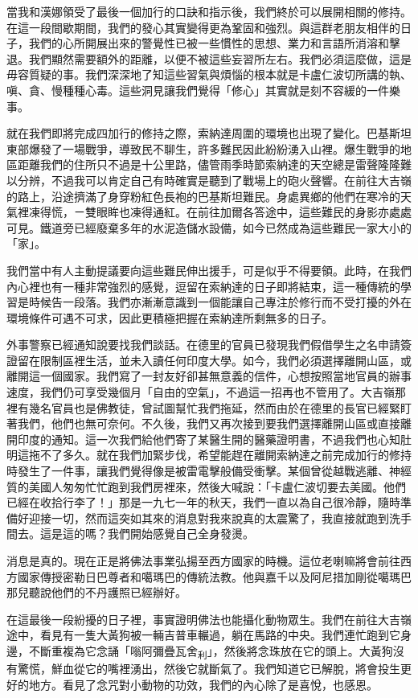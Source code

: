 當我和漢娜領受了最後一個加行的口訣和指示後，我們終於可以展開相關的修持。在這一段間歇期間，我們的發心其實變得更為鞏固和強烈。與這群老朋友相伴的日子，我們的心所開展出來的警覺性已被一些慣性的思想、業力和言語所消溶和擊退。我們顯然需要額外的距離，以便不被這些妄習所左右。我們必須這麼做，這是毋容質疑的事。我們深深地了知這些習氣與煩惱的根本就是卡盧仁波切所講的執、嗔、貪、慢種種心毒。這些洞見讓我們覺得「修心」其實就是刻不容緩的一件樂事。

就在我們即將完成四加行的修持之際，索納達周圍的環境也出現了變化。巴基斯坦東部爆發了一場戰爭，導致民不聊生，許多難民因此紛紛湧入山裡。爆生戰爭的地區距離我們的住所只不過是十公里路，儘管雨季時節索納達的天空總是雷聲隆隆難以分辨，不過我可以肯定自己有時確實是聽到了戰場上的砲火聲響。在前往大吉嶺的路上，沿途擠滿了身穿粉紅色長袍的巴基斯坦難民。身處異鄉的他們在寒冷的天氣裡凍得慌，ㄧ雙眼眸也凍得通紅。在前往加爾各答途中，這些難民的身影亦處處可見。鐵道旁已經廢棄多年的水泥造儲水設備，如今已然成為這些難民一家大小的「家」。

我們當中有人主動提議要向這些難民伸出援手，可是似乎不得要領。此時，在我們內心裡也有一種非常強烈的感覺，逗留在索納達的日子即將結束，這一種傳統的學習是時候告一段落。我們亦漸漸意識到一個能讓自己專注於修行而不受打擾的外在環境條件可遇不可求，因此更積極把握在索納達所剩無多的日子。

外事警察已經通知說要找我們談話。在德里的官員已發現我們假借學生之名申請簽證留在限制區裡生活，並未入讀任何印度大學。如今，我們必須選擇離開山區，或離開這一個國家。我們寫了一封友好卻甚無意義的信件，心想按照當地官員的辦事速度，我們仍可享受幾個月「自由的空氣」，不過這一招再也不管用了。大吉嶺那裡有幾名官員也是佛教徒，曾試圖幫忙我們拖延，然而由於在德里的長官已經緊盯著我們，他們也無可奈何。不久後，我們又再次接到要我們選擇離開山區或直接離開印度的通知。這一次我們給他們寄了某醫生開的醫藥證明書，不過我們也心知肚明這拖不了多久。就在我們加緊步伐，希望能趕在離開索納達之前完成加行的修持時發生了一件事，讓我們覺得像是被雷電擊般備受衝擊。某個曾從越戰逃離、神經質的美國人匆匆忙忙跑到我們房裡來，然後大喊說：「卡盧仁波切要去美國。他們已經在收拾行李了！」那是一九七一年的秋天，我們一直以為自己很冷靜，隨時準備好迎接一切，然而這突如其來的消息對我來說真的太震驚了，我直接就跑到洗手間去。這是這的嗎？我們開始感覺自己全身發燙。

消息是真的。現在正是將佛法事業弘揚至西方國家的時機。這位老喇嘛將會前往西方國家傳授密勒日巴尊者和噶瑪巴的傳統法教。他與嘉千以及阿尼措加剛從噶瑪巴那兒聽說他們的不丹護照已經辦好。

在這最後一段紛擾的日子裡，事實證明佛法也能攝化動物眾生。我們在前往大吉嶺途中，看見有一隻大黃狗被一輛吉普車輾過，躺在馬路的中央。我們連忙跑到它身邊，不斷重複為它念誦「嗡阿彌疊瓦舍\textsubscript{利}」，然後將念珠放在它的頭上。大黃狗沒有驚慌，鮮血從它的嘴裡湧出，然後它就斷氣了。我們知道它已解脫，將會投生更好的地方。看見了念咒對小動物的功效，我們的內心除了是喜悅，也感恩。

